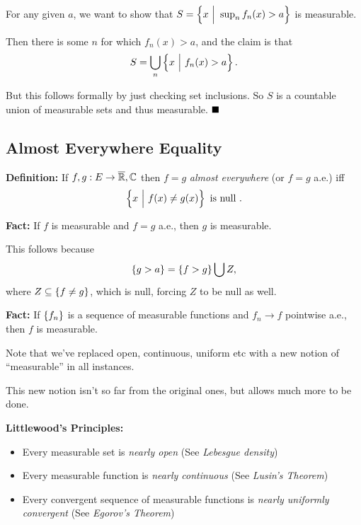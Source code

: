 For any given \(a\), we want to show that
\(S = \left\{{x {~\mathrel{\Big|}~} \sup_n f_n(x) > a}\right\}\) is measurable.

Then there is some \(n\) for which \(f_n(x) > a\), and the claim is that
\begin{align*}
S = \bigcup_n \left\{{x {~\mathrel{\Big|}~} f_n(x) > a}\right\}
.\end{align*}

But this follows formally by just checking set inclusions. So \(S\) is a
countable union of measurable sets and thus measurable. \(\qed\)

\hypertarget{almost-everywhere-equality}{%
\subsection{Almost Everywhere
Equality}\label{almost-everywhere-equality}}

\textbf{Definition:} If \(f,g: E \to \overline {{\mathbb{R}}}, {\mathbb{C}}\) then \(f=g\)
\emph{almost everywhere} (or \(f=g\) a.e.) iff
\begin{align*}
\left\{{x {~\mathrel{\Big|}~} f(x) \neq g(x)}\right\} \text{ is null }
.\end{align*}

\textbf{Fact:} If \(f\) is measurable and \(f=g\) a.e., then \(g\) is
measurable.

This follows because
\begin{align*}
\left\{{g > a}\right\} = \left\{{f > g}\right\} \bigcup Z,\end{align*} where
\(Z \subseteq \left\{{f\neq g}\right\}\), which is null, forcing \(Z\) to be
null as well.

\textbf{Fact:} If \(\left\{{f_n}\right\}\) is a sequence of measurable functions
and \(f_n \to f\) pointwise a.e., then \(f\) is measurable.

Note that we've replaced open, continuous, uniform etc with a new notion
of ``measurable'' in all instances.

This new notion isn't so far from the original ones, but allows much
more to be done.

\textbf{Littlewood's Principles:}

\begin{itemize}
\item
  Every measurable set is \emph{nearly open} (See \emph{Lebesgue
  density})
\item
  Every measurable function is \emph{nearly continuous} (See
  \emph{Lusin's Theorem})
\item
  Every convergent sequence of measurable functions is \emph{nearly
  uniformly convergent} (See \emph{Egorov's Theorem})
\end{itemize}

